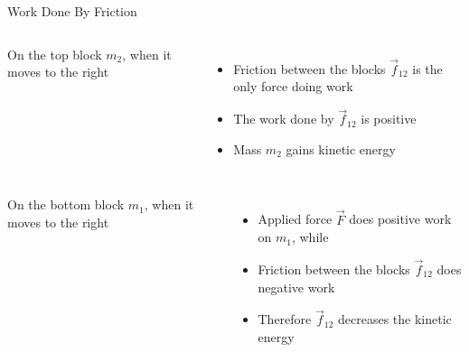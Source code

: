 \documentclass[12pt,compress,aspectratio=169]{beamer}
\begin{document}
\begin{frame}{Work Done By Friction}
  \begin{columns}
    \centering

    On the top block $m_2$, when it moves to the right
    \begin{itemize}
    \item Friction between the blocks $\vec f_{12}$ is the only force doing work
    \item The work done by $\vec f_{12}$ is positive
    \item Mass $m_2$ gains kinetic energy
    \end{itemize}
  \end{columns}
  \begin{columns}
    On the bottom block $m_1$, when it moves to the right
    \begin{itemize}
    \item Applied force $\vec F$ does positive work on $m_1$, while
    \item Friction between the blocks $\vec f_{12}$ does negative work
    \item Therefore $\vec f_{12}$ decreases the kinetic energy
    \end{itemize}
    
    \centering
  \end{columns}
\end{frame}
\end{document}

